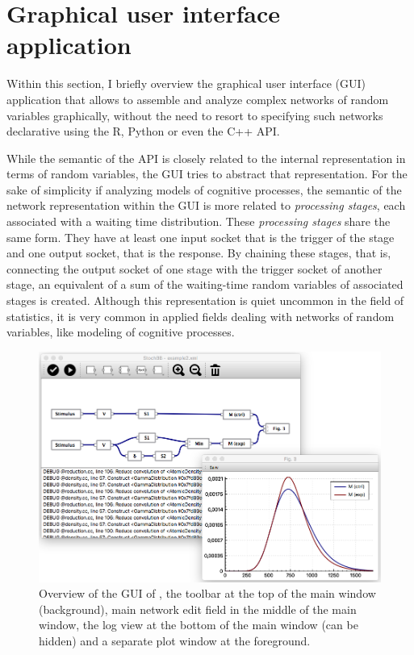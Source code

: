 \section{Graphical user interface application}
Within this section, I briefly overview the graphical user interface (GUI) application that allows to assemble and analyze complex networks of random variables graphically, without the need to resort to specifying such networks declarative using the R, Python or even the C++ API. 

While the semantic of the  API is closely related to the internal representation in terms of random variables, the GUI tries to abstract that representation. For the sake of simplicity if analyzing models of cognitive processes, the semantic of the network representation within the GUI is more related to \emph{processing stages}, each associated with a waiting time distribution. These \emph{processing stages} share the same form. They have at least one input socket that is the trigger of the stage and one output socket, that is the response. By chaining these stages, that is, connecting the output socket of one stage with the trigger socket of another stage, an equivalent of a sum of the waiting-time random variables of associated stages is created. Although this representation is quiet uncommon in the field of statistics, it is very common in applied fields dealing with networks of random variables, like modeling of cognitive processes.

\begin{figure}[!ht]
 \centering
 \includegraphics[width=.75\textwidth]{fig/GUI2.png}
 \caption{Overview of the GUI of , the toolbar at the top of the main window (background), main network edit field in the middle of the main window, the log view at the bottom of the main window (can be hidden) and a separate plot window at the foreground.} \label{fig:gui}
\end{figure}

